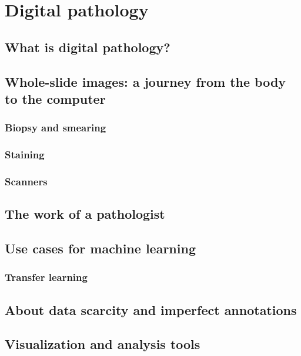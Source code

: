 \chapter{Digital pathology}
\label{chap:backdp}


\section{What is digital pathology?}

\section{Whole-slide images: a journey from the body to the computer}

\subsection{Biopsy and smearing}
\subsection{Staining}
\subsection{Scanners}

\section{The work of a pathologist}

\section{Use cases for machine learning}

\subsection{Transfer learning}
\label{ssec:backdp:tl}

\section{About data scarcity and imperfect annotations}

\parencite{van2019strategies}

\section{Visualization and analysis tools}

